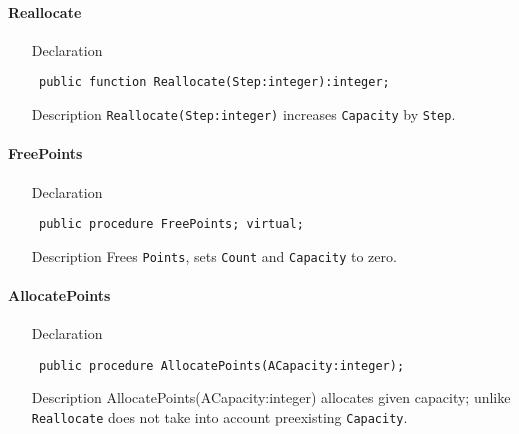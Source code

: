 \documentclass[12pt,a4paper,oneside]{report}
\newcommand{\declarationitem}[1]{{\addfontfeatures{FakeBold=1.3} #1}}
\newcommand{\descriptiontitle}[1]{{\addfontfeatures{FakeSlant}#1}}
\newcommand{\code}[1]{\texttt{#1}}
\begin{document}
\paragraph{Reallocate}\hspace*{\fill}

\label{lmPointsVec.TPoints-Reallocate}
\begin{itemize}\item[\declarationitem{Declaration}\hfill]
	\begin{flushleft}
		\code{
			public function Reallocate(Step:integer):integer;}
		
	\end{flushleft}
	
	\par
	\item[\descriptiontitle{Description}]
	\code{Reallocate(Step:integer)} increases \code{Capacity} by \code{Step}.
	
\end{itemize}
\paragraph{FreePoints}\hspace*{\fill}

\label{lmPointsVec.TPoints-FreePoints}
\begin{itemize}\item[\declarationitem{Declaration}\hfill]
	\begin{flushleft}
		\code{
			public procedure FreePoints; virtual;}
	\end{flushleft}
\item[\descriptiontitle{Description}]
Frees \code{Points}, sets \code{Count} and \code{Capacity} to zero.	
\end{itemize}
\paragraph{AllocatePoints}\hspace*{\fill}

\label{lmPointsVec.TPoints-AllocatePoints}
\begin{itemize}\item[\declarationitem{Declaration}\hfill]
	\begin{flushleft}
		\code{
			public procedure AllocatePoints(ACapacity:integer);}
		
	\end{flushleft}
	
	\par
	\item[\descriptiontitle{Description}]
	AllocatePoints(ACapacity:integer) allocates given capacity; unlike \code{Reallocate} does not take into account preexisting \code{Capacity}.
	
\end{itemize}
\end{document}
